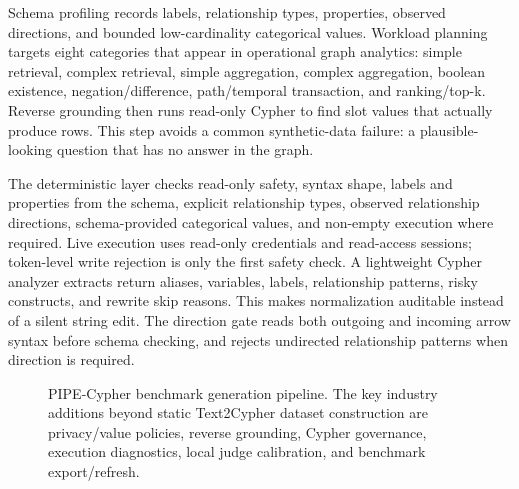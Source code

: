 \documentclass[11pt]{article}
\begin{document}
Schema profiling records labels, relationship types, properties, observed directions, and bounded low-cardinality categorical values. Workload planning targets eight categories that appear in operational graph analytics: simple retrieval, complex retrieval, simple aggregation, complex aggregation, boolean existence, negation/difference, path/temporal transaction, and ranking/top-k. Reverse grounding then runs read-only Cypher to find slot values that actually produce rows. This step avoids a common synthetic-data failure: a plausible-looking question that has no answer in the graph.

The deterministic layer checks read-only safety, syntax shape, labels and properties from the schema, explicit relationship types, observed relationship directions, schema-provided categorical values, and non-empty execution where required. Live execution uses read-only credentials and read-access sessions; token-level write rejection is only the first safety check. A lightweight Cypher analyzer extracts return aliases, variables, labels, relationship patterns, risky constructs, and rewrite skip reasons. This makes normalization auditable instead of a silent string edit. The direction gate reads both outgoing and incoming arrow syntax before schema checking, and rejects undirected relationship patterns when direction is required.

\begin{figure}[t]
\centering
\resizebox{\textwidth}{!}{}
\caption{PIPE-Cypher benchmark generation pipeline. The key industry additions beyond static Text2Cypher dataset construction are privacy/value policies, reverse grounding, Cypher governance, execution diagnostics, local judge calibration, and benchmark export/refresh.}
\label{fig:pipeline_overview}
\end{figure}


\end{document}
